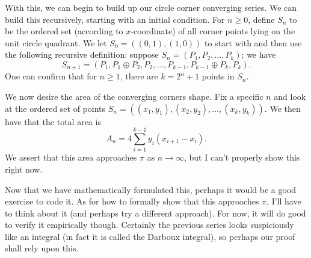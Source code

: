 \documentclass{article}
\begin{document}
With this, we can begin to build up our circle corner converging series. We can
build this recursively, starting with an initial condition. For \( n \geqslant
0 \), define \( S_n \) to be the ordered set (according to \( x \)-coordinate)
of all corner points lying on the unit circle quadrant. We let \( S_0 = \left(
\left( 0, 1 \right), \left( 1, 0 \right) \right) \) to start with and then use
the following recursive definition: suppose \( S_n = \left( P_1, P_2, \ldots,
P_k \right) \); we have
\[
    S_{n+1} = \left( P_1, P_1 \oplus P_2, P_2, \ldots, P_{k-1}, P_{k - 1} \oplus P_k, P_k \right)
.\]
One can confirm that for \( n \geqslant 1 \), there are \( k = 2^n + 1 \) points in
\( S_n \).

We now desire the area of the converging corners shape. Fix a specific \( n \)
and look at the ordered set of points \( S_n = \left( \left( x_1, y_1 \right),
\left( x_2, y_2 \right), \ldots, \left( x_k, y_k \right) \right) \). We then
have that the total area is
\[
    A_n = 4 \sum_{i = 1}^{k - 1} y_i \left( x_{i + 1} - x_i \right)
.\]
We assert that this area approaches \( \pi \) as \( n \to \infty \), but I
can't properly show this right now.

Now that we have mathematically formulated this, perhaps it would be a good
exercise to code it. As for how to formally show that this approaches \( \pi
\), I'll have to think about it (and perhaps try a different approach). For
now, it will do good to verify it empirically though. Certainly the previous
series looks suspiciously like an integral (in fact it is called the Darboux
integral), so perhaps our proof shall rely upon this.
\end{document}
